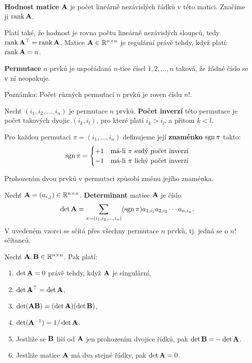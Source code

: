 \begin{df}
{\bf Hodnost matice} $\mathbf{A}$ je počet lineárně nezávislých řádků v této matici.
Značíme ji $\operatorname{rank}\mathbf{A}$.
\end{df}
Platí také, že hodnost je rovna počtu lineárně nezávislých sloupců, tedy $\operatorname{rank}\mathbf{A}^\top=\operatorname{rank}\mathbf{A}$.
Matice $\mathbf{A}\in\mathbb R^{n\times n}$ je regulární právě tehdy, když platí: $\operatorname{rank}\mathbf{A}=n$.


\begin{df}
{\bf Permutace} $n$ prvků je uspořádaná $n$-tice čísel $1,2,\ldots,n$ taková, že žádné číslo se v ní neopakuje.
\end{df}
Poznámka: Počet různých permutací $n$ prvků je roven číslu $n!$.

\begin{df}
Nechť $(i_1,i_2,\ldots,i_n)$ je permutace $n$ prvků.
{\bf Počet inverzí} této permutace je počet takových dvojic $(i_k,i_l)$, pro které platí $i_k>i_l$, a přitom $k<l$.
\end{df}

\begin{df}
Pro každou permutaci $\pi=(i_1,\ldots,i_n)$ definujeme její {\bf znaménko} $\operatorname{sgn}\pi$ takto:
$$ \operatorname{sgn}\pi = \begin{cases}+1 & \mbox{má-li $\pi$ sudý počet inverzí}\\-1 & \mbox{má-li $\pi$ lichý počet inverzí}\end{cases} $$
\end{df}
Prohozením dvou prvků v permutaci způsobí změnu jejího znaménka.

\begin{df}
Nechť $\mathbf{A}=(a_{i,j})\in\mathbb R^{n\times n}$. {\bf Determinant} matice $\mathbf{A}$ je číslo
$$ \det\mathbf{A}=\sum_{\pi=(i_1,i_2,\ldots,i_n)}(\operatorname{sgn}\pi) a_{1,i_1} a_{2,i_2} \cdots a_{n,i_n}. $$
V uvedeném vzorci se sčítá přes všechny permutace $n$ prvků, tj. jedná se o $n!$ sčítanců.
\end{df}


\begin{veta}
Nechť $\mathbf{A},\mathbf{B}\in\mathbb R^{n\times n}$.
Pak platí:
\begin{enumerate}
\item $\det\mathbf{A}=0$ právě tehdy, když $\mathbf{A}$ je singulární,
\item $\det\mathbf{A}^\top=\det\mathbf{A}$,
\item $\det(\mathbf{A}\mathbf{B})=(\det\mathbf{A})(\det\mathbf{B})$,
\item $\det(\mathbf{A}^{-1})=1/\det\mathbf{A}$.
\item Jestliže se $\mathbf{B}$ liší od $\mathbf{A}$ jen prohozením dvojice řídků, pak $\det\mathbf{B}=-\det\mathbf{A}$.
\item Jestliže matice $\mathbf{A}$ má dva stejné řádky, pak $\det\mathbf{A}=0$.
\end{enumerate}
\end{veta}

